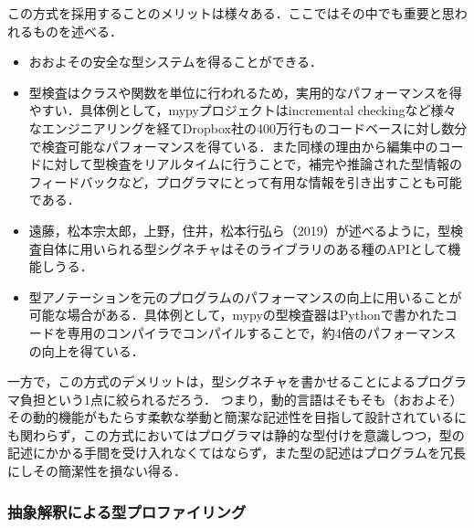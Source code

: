 この方式を採用することのメリットは様々ある．ここではその中でも重要と思われるものを述べる．
\begin{itemize}
  \item おおよその安全な型システムを得ることができる．
  \item 型検査はクラスや関数を単位に行われるため，実用的なパフォーマンスを得やすい．具体例として，mypyプロジェクトはincremental checkingなど様々なエンジニアリングを経てDropbox社の400万行ものコードベースに対し数分で検査可能なパフォーマンスを得ている\cite{dropbox}．また同様の理由から編集中のコードに対して型検査をリアルタイムに行うことで，補完や推論された型情報のフィードバックなど，プログラマにとって有用な情報を引き出すことも可能である．
  \item 遠藤，松本宗太郎，上野，住井，松本行弘ら（2019）\cite{ruby-progress-report}が述べるように，型検査自体に用いられる型シグネチャはそのライブラリのある種のAPIとして機能しうる．
  \item 型アノテーションを元のプログラムのパフォーマンスの向上に用いることが可能な場合がある．具体例として，mypyの型検査器はPythonで書かれたコードを専用のコンパイラでコンパイルすることで，約4倍のパフォーマンスの向上を得ている．
\end{itemize}

一方で，この方式のデメリットは，型シグネチャを書かせることによるプログラマ負担という1点に絞られるだろう．
つまり，動的言語はそもそも（おおよそ）その動的機能がもたらす柔軟な挙動と簡潔な記述性を目指して設計されているにも関わらず，この方式においてはプログラマは静的な型付けを意識しつつ，型の記述にかかる手間を受け入れなくてはならず，また型の記述はプログラムを冗長にしその簡潔性を損ない得る．

\subsubsection{抽象解釈による型プロファイリング}
